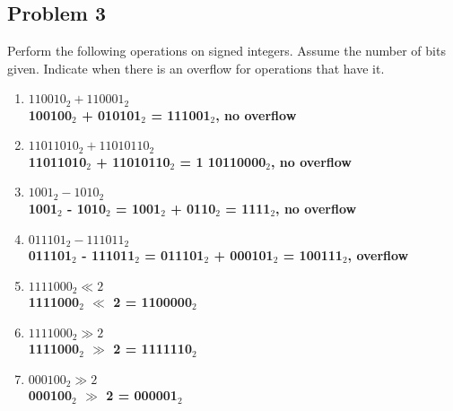 \documentclass{article}
\begin{document}
\subsection*{Problem 3}
Perform the following operations on signed integers. Assume the number of bits given. Indicate when there is an overflow for operations that have it.
\begin{enumerate}[label=\alph*.]
    \item $110010_2 + 110001_2$\\
    \textbf{100100$_2$ + 010101$_2$ = 111001$_2$, no overflow}
    \item $11011010_2 + 11010110_2$\\
    \textbf{11011010$_2$ + 11010110$_2$ = 1 10110000$_2$, no overflow}
    \item $1001_2 - 1010_2$\\
    \textbf{1001$_2$ - 1010$_2$ = 1001$_2$ + 0110$_2$ = 1111$_2$, no overflow}
    \item $011101_2 - 111011_2$\\
    \textbf{011101$_2$ - 111011$_2$ = 011101$_2$ + 000101$_2$ = 100111$_2$, overflow}
    \item $1111000_2 \ll 2$\\ 
    \textbf{1111000$_2$ $\ll$ 2 = 1100000$_2$}
    \item $1111000_2 \gg 2$\\
    \textbf{1111000$_2$ $\gg$ 2 = 1111110$_2$}
    \item $000100_2 \gg 2$\\
    \textbf{000100$_2$ $\gg$ 2 = 000001$_2$}
\end{enumerate}
\end{document}
